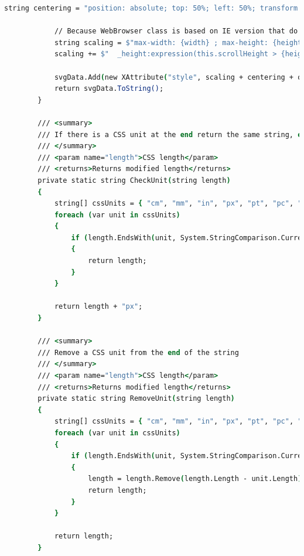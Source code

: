 \documentclass[a4paper,fleqn,12pt]{JMThesis}
\newcommand{\latin}{\fontencoding{T1}\selectfont}
\theoremstyle{plain}
\theoremstyle{definition}
\begin{document}
{\begin{center}
\begin{lstlisting}[language=csh,caption={\latin src/modules/previewpane/SvgPreviewHandler/Utilities/SvgPreviewHandlerHelper.cs }]
            string centering = "position: absolute; top: 50%; left: 50%; transform: translate(-50%, -50%);";

            // Because WebBrowser class is based on IE version that do not support max-width and max-height extra CSS is needed for it to work.
            string scaling = $"max-width: {width} ; max-height: {height} ;";
            scaling += $"  _height:expression(this.scrollHeight > {heightR} ? \" {height}\" : \"auto\"); _width:expression(this.scrollWidth > {widthR} ? \"{width}\" : \"auto\");";

            svgData.Add(new XAttribute("style", scaling + centering + oldStyle));
            return svgData.ToString();
        }

        /// <summary>
        /// If there is a CSS unit at the end return the same string, else return the string with a px unit at the end
        /// </summary>
        /// <param name="length">CSS length</param>
        /// <returns>Returns modified length</returns>
        private static string CheckUnit(string length)
        {
            string[] cssUnits = { "cm", "mm", "in", "px", "pt", "pc", "em", "ex", "ch", "rem", "vw", "vh", "vmin", "vmax", "%" };
            foreach (var unit in cssUnits)
            {
                if (length.EndsWith(unit, System.StringComparison.CurrentCultureIgnoreCase))
                {
                    return length;
                }
            }

            return length + "px";
        }

        /// <summary>
        /// Remove a CSS unit from the end of the string
        /// </summary>
        /// <param name="length">CSS length</param>
        /// <returns>Returns modified length</returns>
        private static string RemoveUnit(string length)
        {
            string[] cssUnits = { "cm", "mm", "in", "px", "pt", "pc", "em", "ex", "ch", "rem", "vw", "vh", "vmin", "vmax", "%" };
            foreach (var unit in cssUnits)
            {
                if (length.EndsWith(unit, System.StringComparison.CurrentCultureIgnoreCase))
                {
                    length = length.Remove(length.Length - unit.Length);
                    return length;
                }
            }

            return length;
        }
    \end{lstlisting}
\end{center}
}
\clearpage
\end{document}
